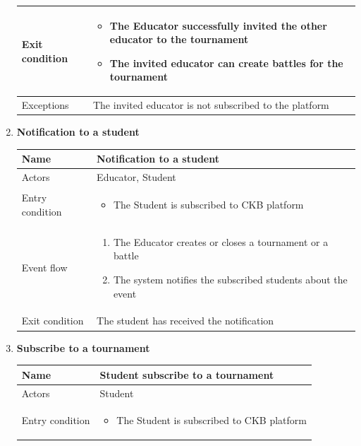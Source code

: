 \begin{enumerate}[label=UC\arabic*:]
\begin{tabular}{|p{3cm}|p{8cm}|}
        \hline
        Exit condition &
        \begin{itemize}
            \item The Educator successfully invited the other educator to the tournament
            \item The invited educator can create battles for the tournament
        \end{itemize} \\
        \hline
        Exceptions & The invited educator is not subscribed to the platform \\
        \hline
    \end{tabular}
    \item \textbf{Notification to a student} \\
    \begin{tabular}{|p{3cm}|p{8cm}|}
        \hline
        Name & Notification to a student \\
        \hline
        Actors & Educator, Student \\
        \hline
        Entry condition &
        \begin{itemize}
            \item The Student is subscribed to CKB platform
        \end{itemize}
        \\
        \hline
        Event flow &
        \begin{enumerate}[label=\arabic*.]
            \item The Educator creates or closes a tournament or a battle
            \item The system notifies the subscribed students about the event
        \end{enumerate}
        \\
        \hline
        Exit condition & The student has received the notification   \\
        \hline
    \end{tabular}
    \item \textbf{Subscribe to a tournament} \\
    \begin{tabular}{|p{3cm}|p{8cm}|}
        \hline
        Name & Student subscribe to a tournament \\
        \hline
        Actors & Student \\
        \hline
        Entry condition &
        \begin{itemize}
            \item The Student is subscribed to CKB platform

\end{itemize}
\end{tabular}
\end{enumerate}
